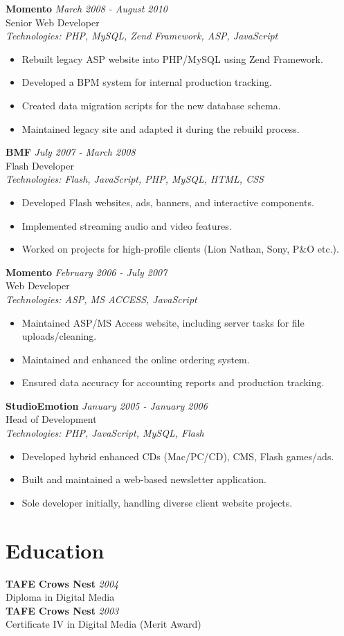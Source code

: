 \documentclass[a4paper,10pt]{article}
\begin{document}
\textbf{Momento} \hfill \textit{March 2008 - August 2010} \\
Senior Web Developer \\
\textit{Technologies: PHP, MySQL, Zend Framework, ASP, JavaScript}
\begin{itemize}
    \item Rebuilt legacy ASP website into PHP/MySQL using Zend Framework.
    \item Developed a BPM system for internal production tracking.
    \item Created data migration scripts for the new database schema.
    \item Maintained legacy site and adapted it during the rebuild process.
\end{itemize}

\textbf{BMF} \hfill \textit{July 2007 - March 2008} \\
Flash Developer \\
\textit{Technologies: Flash, JavaScript, PHP, MySQL, HTML, CSS}
\begin{itemize}
    \item Developed Flash websites, ads, banners, and interactive components.
    \item Implemented streaming audio and video features.
    \item Worked on projects for high-profile clients (Lion Nathan, Sony, P\&O etc.).
\end{itemize}

\textbf{Momento} \hfill \textit{February 2006 - July 2007} \\
Web Developer \\
\textit{Technologies: ASP, MS ACCESS, JavaScript}
\begin{itemize}
    \item Maintained ASP/MS Access website, including server tasks for file uploads/cleaning.
    \item Maintained and enhanced the online ordering system.
    \item Ensured data accuracy for accounting reports and production tracking.
\end{itemize}

\textbf{StudioEmotion} \hfill \textit{January 2005 - January 2006} \\
Head of Development \\
\textit{Technologies: PHP, JavaScript, MySQL, Flash}
\begin{itemize}
    \item Developed hybrid enhanced CDs (Mac/PC/CD), CMS, Flash games/ads.
    \item Built and maintained a web-based newsletter application.
    \item Sole developer initially, handling diverse client website projects.
\end{itemize}

\section*{Education}

\textbf{TAFE Crows Nest} \hfill \textit{2004} \\
Diploma in Digital Media \\
\textbf{TAFE Crows Nest} \hfill \textit{2003} \\
Certificate IV in Digital Media (Merit Award)
\end{document}
